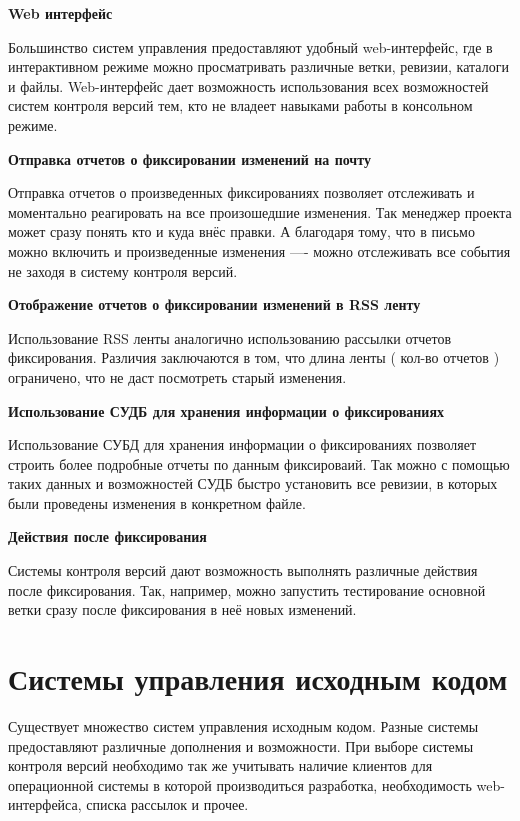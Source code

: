 
\textbf{ Web интерфейс } %

Большинство систем управления предоставляют удобный web-интерфейс, где в интерактивном режиме можно просматривать различные ветки, ревизии, каталоги и файлы. Web-интерфейс дает возможность использования всех возможностей систем контроля версий тем, кто не владеет навыками работы в консольном режиме.

\textbf{ Отправка отчетов о фиксировании изменений на почту } %

Отправка отчетов о произведенных фиксированиях позволяет отслеживать и моментально реагировать на все произошедшие изменения. Так менеджер проекта может сразу понять кто и куда внёс правки. А благодаря тому, что в письмо можно включить и произведенные изменения ---- можно отслеживать все события не заходя в систему контроля версий.

\textbf{ Отображение отчетов о фиксировании изменений в RSS ленту }%

 Использование RSS ленты аналогично использованию рассылки отчетов фиксирования.  Различия заключаются в том, что длина ленты ( кол-во отчетов ) ограничено, что не даст посмотреть старый изменения.
 
 
 \textbf{ Использование СУДБ для хранения информации о фиксированиях } %

Использование СУБД для хранения информации о фиксированиях позволяет строить более подробные отчеты по данным фиксироваий. Так можно с помощью таких данных и возможностей СУДБ быстро установить все ревизии, в которых были проведены изменения в конкретном файле.

 \textbf{ Действия после фиксирования } %
 
 Системы контроля версий дают возможность выполнять различные действия после фиксирования. Так, например, можно запустить тестирование основной ветки сразу после фиксирования в неё новых изменений.
 
 
\section{ Системы управления исходным кодом } \label{sect2_4}
 
Существует множество систем управления исходным кодом. Разные системы предоставляют различные дополнения и возможности. При выборе системы контроля версий необходимо так же учитывать наличие клиентов для операционной системы в которой производиться разработка, необходимость web-интерфейса, списка рассылок и прочее.

